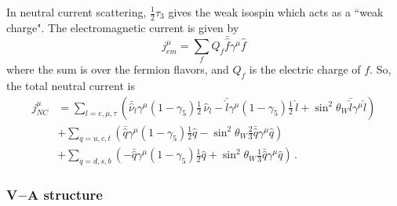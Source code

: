   In neutral current scattering, $\frac{1}{2}\tau_3$ gives the weak isospin
  which acts as a ``weak charge". The electromagnetic current is given by
  \begin{equation}
      j^{\mu}_{em} = \sum_f Q_f \bar{\hat{f}} \gamma^{\mu} \hat{f}
  \end{equation}
  where the sum is over the fermion flavors, and $Q_f$ is the electric charge
  of $f$.  So, the total neutral current is
  \begin{equation}
    \begin{aligned}
        j^{\mu}_{NC} &= \sum_{l=e,\mu,\tau} \left(\bar{\hat{\nu}}_{l}
        \gamma^{\mu}(1-\gamma_5) \frac{1}{2}\, \hat{\nu}_{l} - \bar{\hat{l}}
        \gamma^{\mu}(1-\gamma_5) \frac{1}{2}\, \hat{l} 
        +\sin^2\theta_W \bar{\hat{l}}\gamma^{\mu}\hat{l} \right) \\
        &+ \sum_{q=u,c,t} \left(\bar{\hat{q}} \gamma^{\mu}(1-\gamma_5)\frac{1}{2}\hat{q} 
        - \sin^2\theta_W \frac{2}{3} \bar{\hat{q}}\gamma^{\mu}\hat{q} \right) \\
        &+ \sum_{q=d,s,b} \left(- \bar{\hat{q}} \gamma^{\mu}(1-\gamma_5)\frac{1}{2}\hat{q} 
        + \sin^2\theta_W \frac{1}{3} \bar{\hat{q}}\gamma^{\mu}\hat{q} \right) \,.
     \end{aligned}
  \end{equation}
 
  \subsubsection{V$-$A structure}


